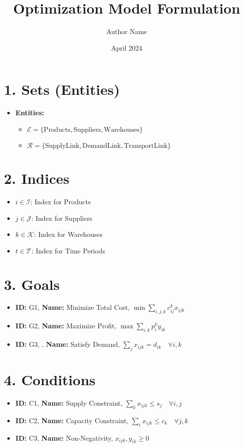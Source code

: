 \documentclass{article}
\title{Optimization Model Formulation}
\author{Author Name}
\date{April 2024}
\begin{document}
\maketitle
\tableofcontents
\newpage

\section{1. Sets (Entities)}
\begin{itemize}
    \item \textbf{Entities:}
    \begin{itemize}
        \item $ \mathcal{E} = \{ \text{Products}, \text{Suppliers}, \text{Warehouses} \} $
        \item $ \mathcal{R} = \{ \text{SupplyLink}, \text{DemandLink}, \text{TransportLink} \} $
    \end{itemize}
\end{itemize}

\section{2. Indices}
\begin{itemize}
    \item $ i \in \mathcal{I} $: Index for Products
    \item $ j \in \mathcal{J} $: Index for Suppliers
    \item $ k \in \mathcal{K} $: Index for Warehouses
    \item $ t \in \mathcal{T} $: Index for Time Periods
\end{itemize}

\section{3. Goals}
\begin{itemize}
    \item \textbf{ID:} G1, \textbf{Name:} Minimize Total Cost, $ \min \sum_{i,j,k} c_{ij}^{k} x_{ijk} $
    \item \textbf{ID:} G2, \textbf{Name:} Maximize Profit, $ \max \sum_{i,k} p_i^{k} y_{ik} $
    \item \textbf{ID:} G3, \text, \textbf{Name:} Satisfy Demand, $ \sum_{j} x_{ijk} = d_{ik} \quad \forall i,k $
\end{itemize}

\section{4. Conditions}
\begin{itemize}
    \item \textbf{ID:} C1, \textbf{Name:} Supply Constraint, $ \sum_{k} x_{ijk} \leq s_j \quad \forall i,j $
    \item \textbf{ID:} C2, \textbf{Name:} Capacity Constraint, $ \sum_{i} x_{ijk} \leq c_k \quad \forall j,k $
    \item \textbf{ID:} C3, \textbf{Name:} Non-Negativity, $ x_{ijk}, y_{ik} \geq 0 $
\end{itemize}
\end{document}
